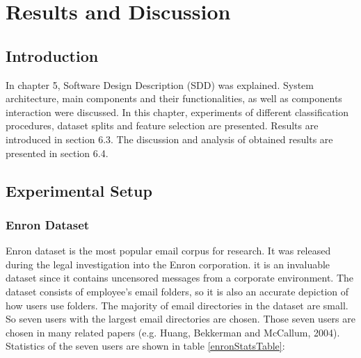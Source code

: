 
\chapter{Results and Discussion} %

\label{Chapter6} %



\section{Introduction}
In chapter 5, Software Design Description (SDD) was explained. System architecture, main components and their functionalities, as well as components interaction were discussed. In this chapter, experiments of different classification procedures, dataset splits and feature selection are presented. Results are introduced in section 6.3. The discussion and analysis of obtained results are presented in section 6.4.


\section{Experimental Setup}

\subsection{Enron Dataset \cite{ENRON}}
Enron dataset is the most popular email corpus for research. It was released during the legal investigation into the Enron corporation.
it is an invaluable dataset since it contains uncensored messages from a corporate environment. The dataset consists of employee’s email folders, so it is also an accurate depiction of how users use folders. The majority of email directories in the dataset are small. So seven users with the largest email directories are chosen. Those seven users are chosen in many related papers (e.g. Huang, Bekkerman and McCallum, 2004\cite{RON04}). \\Statistics of the seven users are shown in table \ref{enronStatsTable}:

